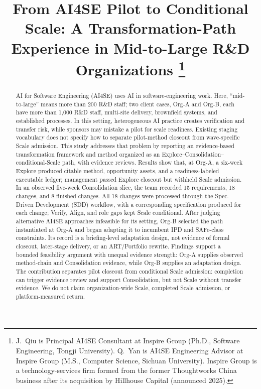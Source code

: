 \documentclass[10pt,conference]{IEEEtran}
\begin{document}
\title{From AI4SE Pilot to Conditional Scale: A Transformation-Path Experience in Mid-to-Large R\&D Organizations%
\thanks{J.~Qiu is Principal AI4SE Consultant at Inspire Group (Ph.D., Software Engineering, Tongji University).
Q.~Yan is AI4SE Engineering Advisor at Inspire Group (M.S., Computer Science, Sichuan University).
Inspire Group is a technology-services firm formed from the former Thoughtworks China business after its acquisition by Hillhouse Capital (announced 2025).}}

\author{
}

\maketitle

\begin{abstract}
AI for Software Engineering (AI4SE) uses AI in software-engineering work.
Here, ``mid-to-large'' means more than 200 R\&D staff; two client cases,
Org-A and Org-B, each have more than 1,000 R\&D staff, multi-site delivery,
brownfield systems, and established processes. In this setting, heterogeneous
AI practice creates verification and transfer risk, while sponsors may mistake
a pilot for scale readiness. Existing staging vocabulary does not
specify how to separate pilot-method closeout from wave-specific Scale
admission. This study addresses that problem by reporting an evidence-based
transformation framework and method organized as an
Explore--Consolidation--conditional-Scale path, with evidence reviews.
Results show that, at Org-A, a six-week Explore produced citable
method, opportunity assets, and a readiness-labeled executable ledger;
management passed Explore closeout but withheld Scale admission. In an observed
five-week Consolidation slice, the team recorded 15 requirements, 18 changes,
and 8 finished changes. All 18 changes were processed through the
Spec-Driven Development (SDD) workflow, with a corresponding specification
produced for each change; Verify, Align, and role gaps kept Scale conditional.
After judging alternative AI4SE
approaches infeasible for its setting, Org-B selected the path instantiated at
Org-A and began adapting it to incumbent IPD and SAFe-class constraints. Its
record is a briefing-level adaptation design, not evidence of formal
closeout, later-stage delivery, or an ART/Portfolio rewrite. Findings
support a bounded feasibility argument with unequal evidence strength: Org-A
supplies observed method-chain and Consolidation evidence, while Org-B supplies
an adaptation design. The contribution separates pilot closeout from
conditional Scale admission: completion can trigger evidence review and
support Consolidation, but not Scale without transfer evidence. We do not
claim organization-wide Scale, completed Scale admission, or
platform-measured return.
\end{abstract}
\end{document}
